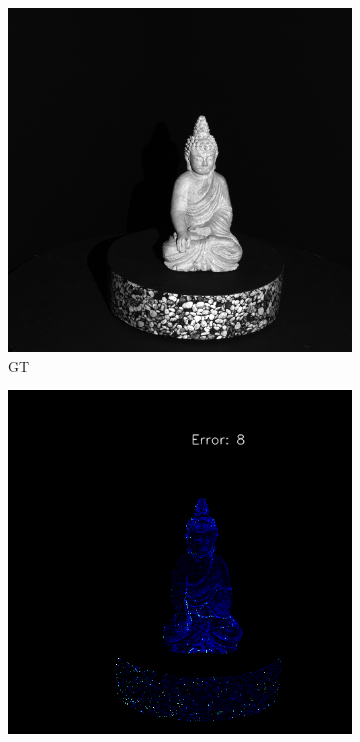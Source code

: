 \begin{figure}[H]
	
	\begin{subfigure}[b]{0.24\linewidth}
		\includegraphics[width=\linewidth]{./Figures/comparison_real/00008.image0.png}
		\caption{GT}
	\end{subfigure}
	\begin{subfigure}[b]{0.24\linewidth}
		\includegraphics[width=\linewidth]{./Figures/comparison_real/fancy_eval_0_error_SVD.png}

\end{subfigure}
\end{figure}
